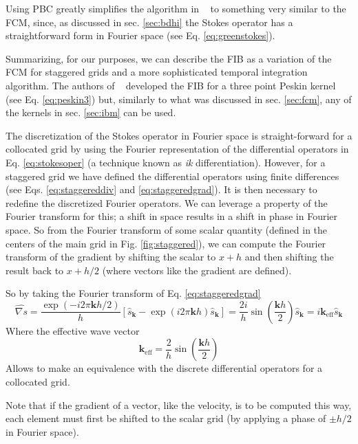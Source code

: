 \documentclass[twoside,openright,titlepage,numbers=noenddot,%
headinclude,footinclude,cleardoublepage=empty,abstract=on,
BCOR=5mm,fontsize=11pt, dvipsnames, paper=b5
]{scrreprt}
\renewcommand{\vec}[1]{\bm{#1}}
\newcommand{\fou}[1]{\widehat{#1}}
\begin{document}
Using \gls{PBC} greatly simplifies the algorithm in ~\cite{Delong2014} to something very similar to the \gls{FCM}, since, as discussed in sec. \ref{sec:bdhi} the Stokes operator has a straightforward form in Fourier space (see Eq. \eqref{eq:greenstokes}).

Summarizing, for our purposes, we can describe the \gls{FIB} as a variation of the \gls{FCM} for staggered grids and a more sophisticated temporal integration algorithm. The authors of ~\cite{Delong2013} developed the \gls{FIB} for a three point Peskin kernel (see Eq. \eqref{eq:peskin3}) but, similarly to what was discussed in sec. \ref{sec:fcm}, any of the kernels in sec. \ref{sec:ibm} can be used.

The discretization of the Stokes operator in Fourier space is straight-forward for a collocated grid by using the Fourier representation of the differential operators in Eq. \eqref{eq:stokesoper} (a technique known as \emph{ik} differentiation). However, for a staggered grid we have defined the differential operators using finite differences (see Eqs. \eqref{eq:staggereddiv} and \eqref{eq:staggeredgrad}). It is then necessary to redefine the discretized Fourier operators. We can leverage a property of the Fourier transform for this; a shift in space results in a shift in phase in Fourier space. So from the Fourier transform of some scalar quantity (defined in the centers of the main grid in Fig. \ref{fig:staggered}), we can compute the Fourier transform of the gradient by shifting the scalar to $x+h$ and then shifting the result back to $x+h/2$ (where vectors like the gradient are defined).

So by taking the Fourier transform of Eq. \eqref{eq:staggeredgrad}
\begin{equation}
  \label{eq:staggeredgradfou}
  \fou{\nabla s} = \frac{\exp(-i2\pi \vec{k} h/2)}{h}\left[\fou{s}_{\vec{k}} - \exp(i2\pi \vec{k} h)\fou{s}_{\vec{k}}\right] = \frac{2i}{h}\sin\left(\frac{\vec{k} h}{2}\right)\fou{s}_{\vec{k}} = i\vec{k}_{\text{eff}}\fou{s}_{\vec{k}}
\end{equation}
Where the effective wave vector
\begin{equation}
  \vec{k}_{\text{eff}} = \frac{2}{h}\sin\left(\frac{\vec{k}h}{2}\right)
\end{equation}
Allows to make an equivalence with the discrete differential operators for a collocated grid.

Note that if the gradient of a vector, like the velocity, is to be computed this way, each element must first be shifted to the scalar grid (by applying a phase of $\pm h/2$ in Fourier space).
\end{document}
